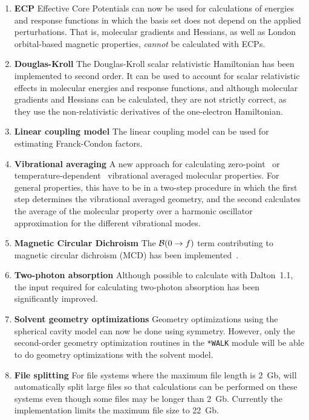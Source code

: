 \begin{enumerate}
\item {\bf ECP} Effective Core Potentials can now be used for calculations
of energies and response functions in which the basis set does not
depend on the applied perturbations. That is, molecular gradients and
Hessians, as well as London orbital-based magnetic properties, {\em cannot}
be calculated with ECPs.

\item {\bf Douglas-Kroll} The Douglas-Kroll scalar relativistic Hamiltonian
has been implemented to second order. It can be used to account for
scalar relativistic effects in molecular energies and response
functions, and although molecular gradients and Hessians can be
calculated, they are not strictly correct, as they use the
non-relativistic derivatives of the one-electron Hamiltonian.

\item {\bf Linear coupling model} The linear coupling model can be used for
estimating Franck-Condon factors.

\item  {\bf Vibrational averaging} A new approach for calculating
zero-point~\cite{poakrprtjcp112,krpoaprtjcp112} or
tem\-pera\-ture-dependent~\cite{krjljv} vibrational averaged molecular
properties. For general properties, this have to be in a two-step
procedure in which the first step determines the vibrational averaged
geometry, and the second calculates the average of the molecular
property over a harmonic oscillator approximation for the different
vibrational modes.

\item {\bf Magnetic Circular Dichroism} The ${\cal{B}}(0\rightarrow f)$ term
contributing to
magnetic circular dichroism (MCD) has been
implemented~\cite{Coriani:MCDRSP}.

\item {\bf Two-photon absorption} Although possible to calculate with
Dalton~1.1, the input required for calculating two-photon absorption
has been significantly improved.

\item{\bf Solvent geometry optimizations} Geometry optimizations using
the spherical cavity model can now be done using symmetry. However,
only the second-order geometry optimization routines in the
\verb|*WALK| module will be able to do geometry optimizations with the
solvent model.

\item {\bf File splitting} For file systems where the maximum file length is
2~Gb, {\dalton} will automatically split large files  so that
calculations can be performed on these systems even though some files
may be longer than 2~Gb. Currently the implementation limits the
maximum file size to 22~Gb.


\end{enumerate}
